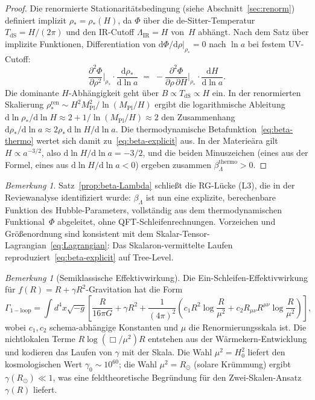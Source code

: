 \documentclass[12pt,a4paper]{article}
\theoremstyle{definition}
\theoremstyle{plain}
\theoremstyle{remark}
\newtheorem{remark}[definition]{Bemerkung}
\newcommand{\LIR}{\Lambda_{\mathrm{IR}}}
\newcommand{\dd}{\mathrm{d}}
\begin{document}
\begin{proof}
Die renormierte Stationarit\"atsbedingung (siehe
Abschnitt~\ref{sec:renorm}) definiert implizit
$\rho_\ast = \rho_\ast(H)$, da $\Phi$ \"uber die
de-Sitter-Temperatur $T_{\mathrm{dS}} = H/(2\pi)$ und den
IR-Cutoff $\LIR = H$ von~$H$ abh\"angt. Nach dem Satz \"uber
implizite Funktionen, Differentiation von
$\dd\Phi/\dd\rho\big|_{\rho_\ast} = 0$ nach $\ln a$ bei festem
UV-Cutoff:
\[
  \frac{\partial^2\Phi}{\partial\rho^2}\bigg|_{\rho_\ast}
  \cdot \frac{\dd\rho_\ast}{\dd\ln a}
  \;=\;
  -\frac{\partial^2\Phi}{\partial\rho\,\partial H}
  \bigg|_{\rho_\ast}
  \cdot \frac{\dd H}{\dd\ln a}.
\]
Die dominante $H$-Abh\"angigkeit geht \"uber
$B \propto T_{\mathrm{dS}} \propto H$ ein. In der renormierten
Skalierung
$\rho_\ast^{\mathrm{ren}} \sim H^2 M_{\mathrm{Pl}}^2/\ln(M_{\mathrm{Pl}}/H)$
ergibt die logarithmische Ableitung
$\dd\ln\rho_\ast/\dd\ln H \approx 2 + 1/\ln(M_{\mathrm{Pl}}/H)
\approx 2$ den Zusammenhang
$\dd\rho_\ast/\dd\ln a \approx 2\rho_\ast\,\dd\ln H/\dd\ln a$.
Die thermodynamische Betafunktion~\eqref{eq:beta-thermo} wertet sich
damit zu~\eqref{eq:beta-explicit} aus.
In der Materie\"ara gilt $H \propto a^{-3/2}$, also
$\dd\ln H/\dd\ln a = -3/2$, und die beiden Minuszeichen (eines aus
der Formel, eines aus $\dd\ln H/\dd\ln a < 0$) ergeben zusammen
$\beta_\Lambda^{\mathrm{thermo}} > 0$.
\end{proof}

\begin{remark}
Satz~\ref{prop:beta-Lambda} schlie\ss t die RG-L\"ucke (L3), die in
der Reviewanalyse identifiziert wurde: $\beta_\Lambda$ ist nun eine
explizite, berechenbare Funktion des Hubble-Parameters, vollst\"andig
aus dem thermodynamischen Funktional~$\Phi$ abgeleitet, ohne
QFT-Schleifenrechnungen. Vorzeichen und Gr\"o\ss enordnung sind
konsistent mit dem
Skalar-Tensor-Lagrangian~\eqref{eq:Lagrangian}: Das
Skalaron-vermittelte Laufen
reproduziert~\eqref{eq:beta-explicit} auf Tree-Level.
\end{remark}

\begin{remark}[Semiklassische Effektivwirkung]
\label{rem:semiclassical}
Die Ein-Schleifen-Effektivwirkung f\"ur $f(R) = R + \gamma R^2$-Gravitation hat die Form
\[
\Gamma_{\mathrm{1-loop}} = \int d^4x \sqrt{-g} \left[ \frac{R}{16\pi G} + \gamma R^2 + \frac{1}{(4\pi)^2} \left( c_1 R^2 \log\frac{R}{\mu^2} + c_2 R_{\mu\nu} R^{\mu\nu} \log\frac{R}{\mu^2} \right) \right],
\]
wobei $c_1, c_2$ schema-abh\"angige Konstanten und $\mu$ die Renormierungsskala ist. Die nichtlokalen Terme $R \log(\Box/\mu^2) R$ entstehen aus der W\"arme\-kern-Entwicklung und kodieren das Laufen von $\gamma$ mit der Skala. Die Wahl $\mu^2 = H_0^2$ liefert den kosmologischen Wert $\gamma_0 \sim 10^{60}$; die Wahl $\mu^2 = R_{\odot}$ (solare Kr\"ummung) ergibt $\gamma(R_{\odot}) \ll 1$, was eine feldtheoretische Begr\"undung f\"ur den Zwei-Skalen-Ansatz $\gamma(R)$ liefert.
\end{remark}
\end{document}
